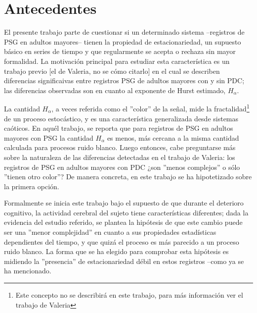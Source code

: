 \chapter{Antecedentes}


El presente trabajo parte de cuestionar si un determinado sistema --registros de PSG en adultos 
mayores-- tienen la propiedad de estacionariedad, un supuesto b\'asico en series de tiempo y que 
regularmente se acepta o rechaza sin mayor formalidad.
La motivaci\'on principal para estudiar esta caracter\'istica es un trabajo previo [el de Valeria,
no se c\'omo citarlo] en el cual se describen diferencias significaivas entre registros PSG de
adultos mayores con y sin PDC; las diferencias observadas son en cuanto al exponente de Hurst 
estimado, $H_\alpha$.

La cantidad $H_\alpha$, a veces referida como el ''color'' de la se\~nal, 
mide la fractalidad\footnote{Este concepto no se
describir\'a en este trabajo, para m\'as informaci\'on ver el trabajo de Valeria} 
de un proceso estoc\'astico, y es una caracter\'istica generalizada desde sistemas ca\'oticos.
En aqu\'el trabajo, se reporta que
para registros de PSG en adultos mayores con PSG la cantidad $H_\alpha$ es menos, m\'as
cercana a la misma cantidad calculada para procesos ruido blanco.
Luego entonces, cabe preguntarse m\'as sobre la naturaleza de las diferencias detectadas en 
el trabajo de Valeria: los registros de PSG en adultos mayores con PDC ¿son ''menos complejos'' o 
s\'olo ''tienen otro color''?
De manera concreta, en este trabajo se ha hipotetizado sobre la primera opci\'on. 

Formalmente se inicia
este trabajo bajo el supuesto de que durante el deterioro cognitivo, la actividad cerebral
del sujeto tiene caracter\'isticas diferentes; 
dada la evidencia del estudio referido, se plantea la hip\'otesis de que este cambio puede ser
una ''menor complejidad'' en cuanto a sus propiedades estad\'isticas 
dependientes del tiempo, y que quiz\'a el proceso es m\'as parecido a un proceso ruido blanco.
La forma que se ha elegido para comprobar esta hip\'otesis es midiendo la ''presencia'' de
estacionariedad d\'ebil en estos registros --como ya se ha mencionado.

